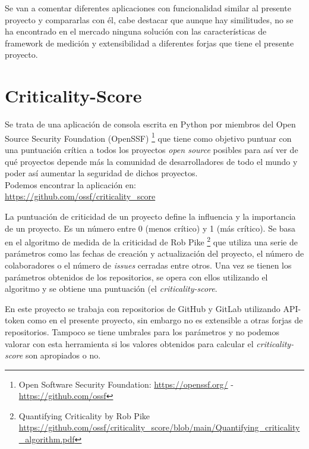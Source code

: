 
Se van a comentar diferentes aplicaciones con funcionalidad similar al presente proyecto y compararlas con él, cabe destacar que aunque hay similitudes, no se ha encontrado en el mercado ninguna solución con las características de framework de medición y extensibilidad a diferentes forjas que tiene el presente proyecto.

\section{Criticality-Score}
Se trata de una aplicación de consola escrita en Python por miembros del Open Source Security Foundation (OpenSSF) \footnote{Open Software Security Foundation:  \url{https://openssf.org/} - \url{https://github.com/ossf}} que tiene como objetivo puntuar con una puntuación crítica a  todos los proyectos \textit{open source} posibles para así ver de qué proyectos depende más la comunidad de desarrolladores de todo el mundo y poder así aumentar la seguridad de dichos proyectos.\\

Podemos encontrar la aplicación en:\\
\url{https://github.com/ossf/criticality_score}


La puntuación de criticidad de un proyecto define la influencia y la importancia de un proyecto. Es un número entre 0 (menos crítico) y 1 (más crítico). Se basa en el algoritmo de medida de la criticidad de Rob Pike  \footnote{Quantifying Criticality by Rob Pike  \url{https://github.com/ossf/criticality_score/blob/main/Quantifying_criticality_algorithm.pdf}} que utiliza una serie de parámetros como las fechas de creación y actualización del proyecto, el número de colaboradores o el número de \textit{issues} cerradas entre otros. Una vez se tienen los parámetros obtenidos de los repositorios, se opera con ellos utilizando el algoritmo y se obtiene una puntuación (el \textit{criticality-score}.

En este proyecto se trabaja con repositorios de GitHub y GitLab utilizando API-token como en el presente proyecto, sin embargo no es extensible a otras forjas de repositorios. Tampoco se tiene umbrales para los parámetros y no podemos valorar con esta herramienta si los valores obtenidos para calcular el \textit{criticality-score} son apropiados o no.


